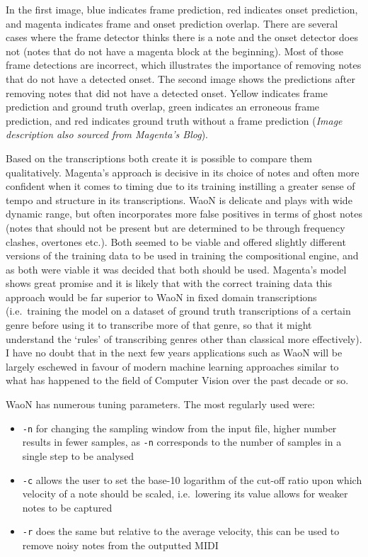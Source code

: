 \documentclass[12pt,]{article}
\providecommand{\tightlist}{%
  \setlength{\itemsep}{0pt}\setlength{\parskip}{0pt}}
\begin{document}
In the first image, blue indicates frame prediction, red indicates onset
prediction, and magenta indicates frame and onset prediction overlap.
There are several cases where the frame detector thinks there is a note
and the onset detector does not (notes that do not have a magenta block
at the beginning). Most of those frame detections are incorrect, which
illustrates the importance of removing notes that do not have a detected
onset. The second image shows the predictions after removing notes that
did not have a detected onset. Yellow indicates frame prediction and
ground truth overlap, green indicates an erroneous frame prediction, and
red indicates ground truth without a frame prediction
(\textit{Image description also sourced from Magenta's Blog}).

Based on the transcriptions both create it is possible to compare them
qualitatively. Magenta's approach is decisive in its choice of notes and
often more confident when it comes to timing due to its training
instilling a greater sense of tempo and structure in its transcriptions.
WaoN is delicate and plays with wide dynamic range, but often
incorporates more false positives in terms of ghost notes (notes that
should not be present but are determined to be through frequency
clashes, overtones etc.). Both seemed to be viable and offered slightly
different versions of the training data to be used in training the
compositional engine, and as both were viable it was decided that both
should be used. Magenta's model shows great promise and it is likely
that with the correct training data this approach would be far superior
to WaoN in fixed domain transcriptions (i.e.~training the model on a
dataset of ground truth transcriptions of a certain genre before using
it to transcribe more of that genre, so that it might understand the
`rules' of transcribing genres other than classical more effectively). I
have no doubt that in the next few years applications such as WaoN will
be largely eschewed in favour of modern machine learning approaches
similar to what has happened to the field of Computer Vision over the
past decade or so.

WaoN has numerous tuning parameters. The most regularly used were:

\begin{itemize}
\tightlist
\item
  \texttt{-n} for changing the sampling window from the input file,
  higher number results in fewer samples, as \texttt{-n} corresponds to
  the number of samples in a single step to be analysed
\item
  \texttt{-c} allows the user to set the base-10 logarithm of the
  cut-off ratio upon which velocity of a note should be scaled,
  i.e.~lowering its value allows for weaker notes to be captured
\item
  \texttt{-r} does the same but relative to the average velocity, this
  can be used to remove noisy notes from the outputted MIDI
\end{itemize}
\end{document}
